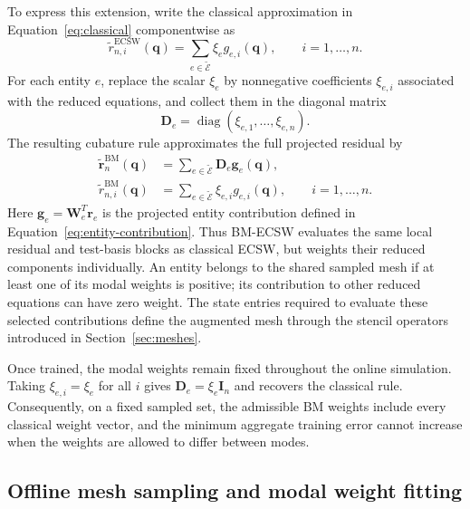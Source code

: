 \documentclass[a4paper,12pt]{article}
\newcommand{\vect}[1]{\boldsymbol{#1}}
\newcommand{\matr}[1]{\boldsymbol{#1}}
\begin{document}
To express this extension, write the classical approximation in Equation~\eqref{eq:classical} componentwise as
\begin{equation}
 \widetilde r_{n,i}^{\mathrm{ECSW}}(\vect{q})
 =\sum_{e\in\widetilde{\mathcal E}}\xi_e g_{e,i}(\vect{q}),
 \qquad i=1,\ldots,n.
\end{equation}
For each entity $e$, replace the scalar $\xi_e$ by nonnegative coefficients $\xi_{e,i}$ associated with the reduced equations, and collect them in the diagonal matrix
\begin{equation}
 \matr{D}_e=\operatorname{diag}(\xi_{e,1},\ldots,\xi_{e,n}).
\end{equation}
The resulting cubature rule approximates the full projected residual by
\begin{equation}
 \begin{aligned}
 \widetilde{\vect{r}}_n^{\mathrm{BM}}(\vect{q})
 &=\sum_{e\in\widetilde{\mathcal E}}\matr{D}_e\vect{g}_e(\vect{q}),\\
 \widetilde r_{n,i}^{\mathrm{BM}}(\vect{q})
 &=\sum_{e\in\widetilde{\mathcal E}}\xi_{e,i}g_{e,i}(\vect{q}),
 \qquad i=1,\ldots,n.
 \end{aligned}
 \label{eq:bm}
\end{equation}
Here $\vect{g}_e=\matr{W}_e^T\vect{r}_e$ is the projected entity contribution defined in Equation~\eqref{eq:entity-contribution}. Thus BM-ECSW evaluates the same local residual and test-basis blocks as classical ECSW, but weights their reduced components individually. An entity belongs to the shared sampled mesh if at least one of its modal weights is positive; its contribution to other reduced equations can have zero weight. The state entries required to evaluate these selected contributions define the augmented mesh through the stencil operators introduced in Section~\ref{sec:meshes}.

Once trained, the modal weights remain fixed throughout the online simulation. Taking $\xi_{e,i}=\xi_e$ for all $i$ gives $\matr{D}_e=\xi_e\matr{I}_n$ and recovers the classical rule. Consequently, on a fixed sampled set, the admissible BM weights include every classical weight vector, and the minimum aggregate training error cannot increase when the weights are allowed to differ between modes.

\subsection{Offline mesh sampling and modal weight fitting}
\end{document}
